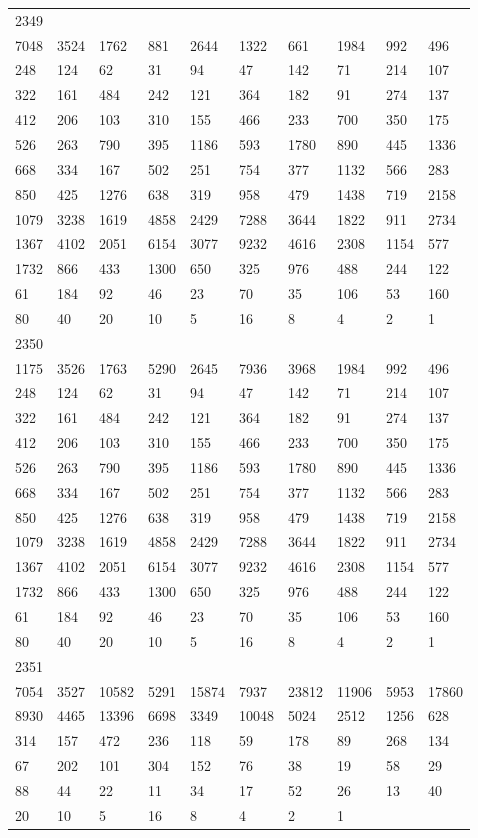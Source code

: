 \begin{longtable}{*{10}{l}}
2349&&&&&&&&&\\
7048& 3524& 1762& 881& 2644& 1322& 661& 1984& 992& 496\\
248& 124& 62& 31& 94& 47& 142& 71& 214& 107\\
322& 161& 484& 242& 121& 364& 182& 91& 274& 137\\
412& 206& 103& 310& 155& 466& 233& 700& 350& 175\\
526& 263& 790& 395& 1186& 593& 1780& 890& 445& 1336\\
668& 334& 167& 502& 251& 754& 377& 1132& 566& 283\\
850& 425& 1276& 638& 319& 958& 479& 1438& 719& 2158\\
1079& 3238& 1619& 4858& 2429& 7288& 3644& 1822& 911& 2734\\
1367& 4102& 2051& 6154& 3077& 9232& 4616& 2308& 1154& 577\\
1732& 866& 433& 1300& 650& 325& 976& 488& 244& 122\\
61& 184& 92& 46& 23& 70& 35& 106& 53& 160\\
80& 40& 20& 10& 5& 16& 8& 4& 2& 1\\

2350&&&&&&&&&\\
1175& 3526& 1763& 5290& 2645& 7936& 3968& 1984& 992& 496\\
248& 124& 62& 31& 94& 47& 142& 71& 214& 107\\
322& 161& 484& 242& 121& 364& 182& 91& 274& 137\\
412& 206& 103& 310& 155& 466& 233& 700& 350& 175\\
526& 263& 790& 395& 1186& 593& 1780& 890& 445& 1336\\
668& 334& 167& 502& 251& 754& 377& 1132& 566& 283\\
850& 425& 1276& 638& 319& 958& 479& 1438& 719& 2158\\
1079& 3238& 1619& 4858& 2429& 7288& 3644& 1822& 911& 2734\\
1367& 4102& 2051& 6154& 3077& 9232& 4616& 2308& 1154& 577\\
1732& 866& 433& 1300& 650& 325& 976& 488& 244& 122\\
61& 184& 92& 46& 23& 70& 35& 106& 53& 160\\
80& 40& 20& 10& 5& 16& 8& 4& 2& 1\\

2351&&&&&&&&&\\
7054& 3527& 10582& 5291& 15874& 7937& 23812& 11906& 5953& 17860\\
8930& 4465& 13396& 6698& 3349& 10048& 5024& 2512& 1256& 628\\
314& 157& 472& 236& 118& 59& 178& 89& 268& 134\\
67& 202& 101& 304& 152& 76& 38& 19& 58& 29\\
88& 44& 22& 11& 34& 17& 52& 26& 13& 40\\
20& 10& 5& 16& 8& 4& 2& 1& \\


\end{longtable}
